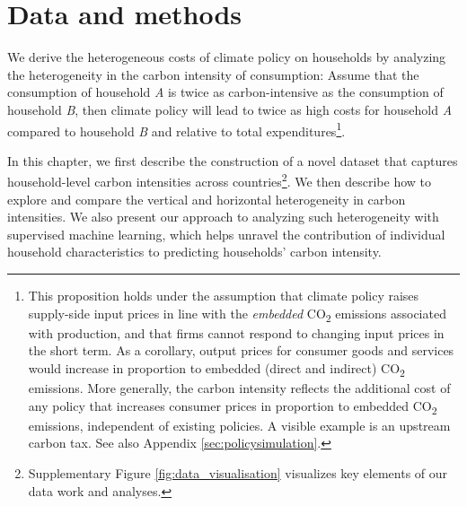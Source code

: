 \documentclass[12pt, a4paper]{article}
\begin{document}

\section{Data and methods} \label{sec:data_methods}

We derive the heterogeneous costs of climate policy on households by analyzing the heterogeneity in the carbon intensity of consumption: Assume that the consumption of household \textit{A} is twice as carbon-intensive as the consumption of household \textit{B}, then climate policy will lead to twice as high costs for household \textit{A} compared to household \textit{B} and relative to total expenditures\footnote{This proposition holds under the assumption that climate policy raises supply-side input prices in line with the \textit{embedded} CO\textsubscript{2} emissions associated with production, and that firms cannot respond to changing input prices in the short term. As a corollary, output prices for consumer goods and services would increase in proportion  to embedded (direct and indirect) CO\textsubscript{2} emissions. More generally, the carbon intensity reflects the additional cost of any policy that increases consumer prices in proportion to embedded CO\textsubscript{2} emissions, independent of existing policies. A visible example is an upstream carbon tax. See also Appendix \ref{sec:policysimulation}.}.

In this chapter, we first describe the construction of a novel dataset that captures household-level carbon intensities across countries\footnote{Supplementary Figure \ref{fig:data_visualisation} visualizes key elements of our data work and analyses.}. We then describe how to explore and compare the vertical and horizontal heterogeneity in carbon intensities. We also present our approach to analyzing such heterogeneity with supervised machine learning, which helps unravel the contribution of individual household characteristics to predicting households' carbon intensity.
\end{document}
